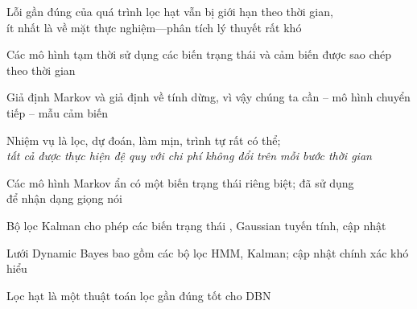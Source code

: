 \documentclass{article}
\begin{document}
\begin{huge}

Lỗi gần đúng của quá trình lọc hạt vẫn bị giới hạn theo thời gian,\\
ít nhất là về mặt thực nghiệm---phân tích lý thuyết rất khó

\vspace*{0.3in}

\textwidth
{}






Các mô hình tạm thời sử dụng các biến trạng thái và cảm biến được sao chép theo thời gian

Giả định Markov và giả định về tính dừng, vì vậy chúng ta cần\al
 -- mô hình chuyển tiếp\al
 -- mẫu cảm biến 

Nhiệm vụ là lọc, dự đoán, làm mịn, trình tự rất có thể;\\
\emph{tất cả được thực hiện đệ quy với chi phí không đổi trên mỗi bước thời gian}


Các mô hình Markov ẩn có một biến trạng thái riêng biệt; đã sử dụng \\
để nhận dạng giọng nói

Bộ lọc Kalman cho phép các biến trạng thái , Gaussian tuyến tính, cập nhật 

Lưới Dynamic Bayes bao gồm các bộ lọc HMM, Kalman; cập nhật chính xác khó hiểu

Lọc hạt là một thuật toán lọc gần đúng tốt cho DBN



\end{huge} 
\end{document}
